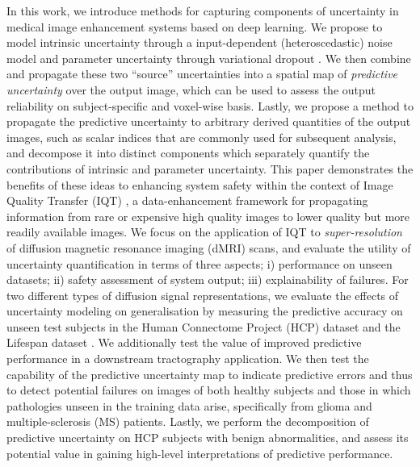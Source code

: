 
In this work, we introduce methods for capturing components of uncertainty in medical image enhancement systems based on deep learning. We propose to model intrinsic uncertainty through a input-dependent (heteroscedastic) noise model \cite{nix1994estimating} and parameter uncertainty through variational dropout \cite{kingma2015variational}. We then combine and propagate these two ``source'' uncertainties into a spatial map of \textit{predictive uncertainty} over the output image, which can be used to assess the output reliability on subject-specific and voxel-wise basis. Lastly, we propose a method to propagate the predictive uncertainty to arbitrary derived quantities of the output images, such as scalar indices that are commonly used for subsequent analysis, and decompose it into distinct components which separately quantify the contributions of intrinsic and parameter uncertainty. This paper demonstrates the benefits of these ideas to enhancing system safety within the context of Image Quality Transfer (IQT) \cite{alexander2014image,tanno2016bayesian,alexander2017image,blumberg2018deeper}, a data-enhancement framework for propagating information from rare or expensive high quality images to lower quality but more readily available images. We focus on the application of IQT to \textit{super-resolution} of diffusion magnetic resonance imaging (dMRI) scans, and evaluate the utility of uncertainty quantification in terms of three aspects; i) performance on unseen datasets; ii) safety assessment of system output; iii) explainability of failures. For two different types of diffusion signal representations, we evaluate the effects of uncertainty modeling on generalisation by measuring the predictive accuracy on unseen test subjects in the Human Connectome Project (HCP) dataset \cite{sotiropoulos2013advances} and the Lifespan dataset \cite{harms2018extending}. We additionally test the value of improved predictive performance in a downstream tractography application. We then test the capability of the predictive uncertainty map to indicate predictive errors and thus to detect potential failures on images of both healthy subjects and those in which pathologies unseen in the training data arise, specifically from glioma and multiple-sclerosis (MS) patients. Lastly, we perform the decomposition of predictive uncertainty on HCP subjects with benign abnormalities, and assess its potential value in gaining high-level interpretations of predictive performance. 


